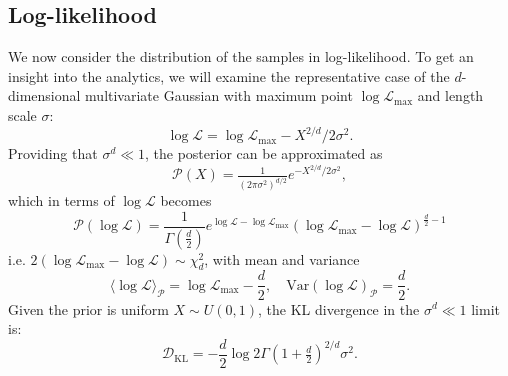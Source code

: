 \documentclass[usenatbib]{mnras}
\newcommand{\Like}{\mathcal{L}}
\newcommand{\logLmax}{\log \Like_\mathrm{max}}
\begin{document}
\subsection{Log-likelihood}\label{sec:logL}
We now consider the distribution of the samples in log-likelihood. To get an insight into the analytics, we will examine the representative case of the $d$-dimensional multivariate Gaussian with maximum point $\logLmax$ and length scale $\sigma$:
\begin{equation}\label{eq:gaussian_logL}
    \log \Like = \logLmax - X^{2/d}/2\sigma^2.
\end{equation}
Providing that $\sigma^d \ll 1$, the posterior can be approximated as 
\begin{equation}
    \mathcal{P}(X) = \tfrac{1}{(2\pi\sigma^2)^{d/2}} e^{-X^{2/d}/2\sigma^2}, 
    \label{eqn:PX}
\end{equation}
which in terms of $\log\mathcal{L}$ becomes
\begin{equation}
    \mathcal{P}(\log\mathcal{L}) = \frac{1}{\Gamma\left(\frac{d}{2}\right)}e^{\log\mathcal{L}-\log\mathcal{L}_\mathrm{max}} (\log\mathcal{L}_\mathrm{max}-\log\mathcal{L})^{\frac{d}{2}-1}
\end{equation}
i.e. $2(\log\mathcal{L}_\mathrm{max}-\log\mathcal{L}) \sim \chi^2_{d}$, with mean and variance
\begin{equation}
    \langle\log\mathcal{L}\rangle_\mathcal{P} = \log\mathcal{L}_\mathrm{max} - \frac{d}{2},  \quad \mathrm{Var}(\log\mathcal{L})_\mathcal{P} = \frac{d}{2}.
\end{equation}
Given the prior is uniform $X\sim U(0,1)$, the KL divergence in the $\sigma^d \ll 1$ limit is:
\begin{equation}
\mathcal{D}_\mathrm{KL} = -\frac{d}{2}\log 2 \Gamma(1+\tfrac{d}{2})^{2/d} \sigma^2.
\end{equation}
\end{document}
